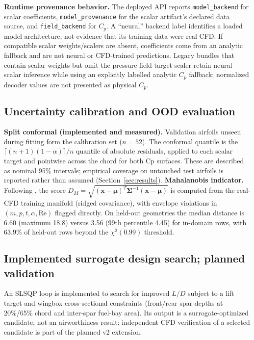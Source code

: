 \documentclass[11pt]{article}
\begin{document}
\textbf{Runtime provenance behavior.} The deployed API reports
\texttt{model\_backend} for scalar coefficients, \texttt{model\_provenance} for
the scalar artifact's declared data source, and \texttt{field\_backend} for
$C_p$. A ``neural'' backend label identifies a loaded model architecture, not
evidence that its training data were real CFD. If compatible scalar weights/scalers are absent, coefficients come from
an analytic fallback and are not neural or CFD-trained predictions. Legacy
bundles that contain scalar weights but omit the pressure-field target scaler
retain neural scalar inference while using an explicitly labelled analytic
$C_p$ fallback; normalized decoder values are not presented as physical $C_p$.

\subsection{Uncertainty calibration and OOD evaluation}
\label{sec:uq}
\textbf{Split conformal (implemented and measured).} Validation airfoils unseen
during fitting form the calibration set ($n=52$). The conformal quantile is the
$\lceil (n+1)(1-\alpha)\rceil/n$ quantile of absolute residuals, applied to
each scalar target and pointwise across the chord for both Cp surfaces. These
are described as nominal 95\% intervals; empirical coverage on untouched test
airfoils is reported rather than assumed (Section~\ref{sec:results}).
\textbf{Mahalanobis indicator.} Following \citet{lee2018}, the score
$D_M = \sqrt{(\mathbf{x}-\boldsymbol{\mu})^T \boldsymbol{\Sigma}^{-1}
(\mathbf{x}-\boldsymbol{\mu})}$ is computed from the real-CFD training
manifold (ridged covariance), with envelope violations in
$(m,p,t,\alpha,\mathrm{Re})$ flagged directly. On held-out geometries the
median distance is 6.60 (maximum 18.8) versus 3.56 (99th percentile 4.45) for
in-domain rows, with 63.9\% of held-out rows beyond the $\chi^2(0.99)$
threshold.

\subsection{Implemented surrogate design search; planned validation}
An SLSQP loop \citep{kraft1988} is implemented to search for improved $L/D$
subject to a lift target and wingbox cross-sectional constraints (front/rear
spar depths at 20\%/65\% chord and inter-spar fuel-bay area). Its output is a
surrogate-optimized candidate, not an airworthiness result; independent CFD
verification of a selected candidate is part of the planned v2 extension.
\end{document}
